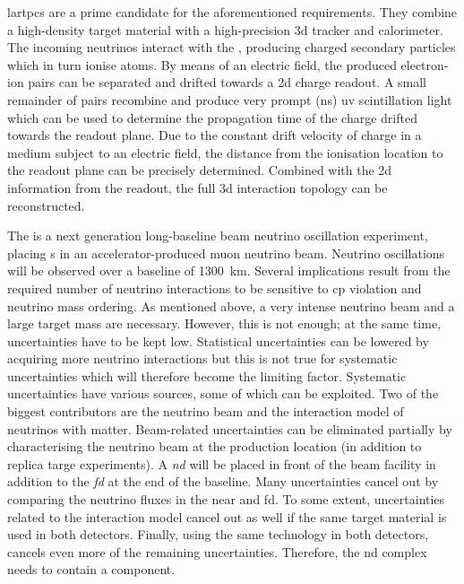 \glspl{lartpc} are a prime candidate for the aforementioned requirements.
They combine a high-density target material with a high-precision \gls{3d} tracker and calorimeter.
The incoming neutrinos interact with the \lar{}, producing charged secondary particles which in turn ionise  atoms.
By means of an electric field, the produced electron-ion pairs can be separated and drifted towards a \gls{2d} charge readout.
A small remainder of pairs recombine and produce very prompt (\si{\nano\second}) \gls{uv} scintillation light which can be used to determine the propagation time of the charge drifted towards the readout plane.
Due to the constant drift velocity of charge in a medium subject to an electric field, the distance from the ionisation location to the readout plane can be precisely determined.
Combined with the \gls{2d} information from the readout, the full \gls{3d} interaction topology can be reconstructed.

The \dune{} is a next generation long-baseline beam neutrino oscillation experiment, placing \lartpc{}s in an accelerator-produced muon neutrino beam.
Neutrino oscillations will be observed over a baseline of \SI{1300}{\kilo\metre}.
Several implications result from the required number of neutrino interactions to be sensitive to \gls{cp} violation and neutrino mass ordering.
As mentioned above, a very intense neutrino beam and a large target mass are necessary.
However, this is not enough; at the same time, uncertainties have to be kept low.
Statistical uncertainties can be lowered by acquiring more neutrino interactions but this is not true for systematic uncertainties which will therefore become the limiting factor.
Systematic uncertainties have various sources, some of which can be exploited.
Two of the biggest contributors are the neutrino beam and the interaction model of neutrinos with matter.
Beam-related uncertainties can be eliminated partially by characterising the neutrino beam at the production location (in addition to replica targe experiments).
A \emph{\gls{nd}} will be placed in front of the beam facility in addition to the \emph{\gls{fd}} at the end of the baseline.
Many uncertainties cancel out by comparing the neutrino fluxes in the near and \gls{fd}.
To some extent, uncertainties related to the interaction model cancel out as well if the same target material is used in both detectors.
Finally, using the same technology in both detectors, cancels even more of the remaining uncertainties.
Therefore, the \gls{nd} complex needs to contain a \lartpc{} component.


